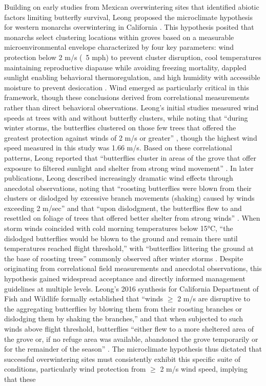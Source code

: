 Building on early studies from Mexican overwintering sites that identified abiotic factors limiting butterfly survival, Leong proposed the microclimate hypothesis for western monarchs overwintering in California \parencite{leongMicroenvironmentalFactorsAssociated1990}. This hypothesis posited that monarchs select clustering locations within groves based on a measurable microenvironmental envelope characterized by four key parameters: wind protection below 2 m/s (~5 mph) to prevent cluster disruption, cool temperatures maintaining reproductive diapause while avoiding freezing mortality, dappled sunlight enabling behavioral thermoregulation, and high humidity with accessible moisture to prevent desiccation \parencite{leongMicroenvironmentalFactorsAssociated1990,leongUseMultivariateAnalyses1991}. Wind emerged as particularly critical in this framework, though these conclusions derived from correlational measurements rather than direct behavioral observations. Leong's initial studies measured wind speeds at trees with and without butterfly clusters, while noting that ``during winter storms, the butterflies clustered on those few trees that offered the greatest protection against winds of 2 m/s or greater'' \parencite{leongMicroenvironmentalFactorsAssociated1990}, though the highest wind speed measured in this study was 1.66 m/s. Based on these correlational patterns, Leong reported that ``butterflies cluster in areas of the grove that offer exposure to filtered sunlight and shelter from strong wind movement'' \parencite{leongUseMultivariateAnalyses1991}. In later publications, Leong described increasingly dramatic wind effects through anecdotal observations, noting that ``roosting butterflies were blown from their clusters or dislodged by excessive branch movements (shaking) caused by winds exceeding 2 m/sec'' and that ``upon dislodgment, the butterflies flew to and resettled on foliage of trees that offered better shelter from strong winds'' \parencite{leongRestorationOverwinteringGrove1999}. When storm winds coincided with cold morning temperatures below 15°C, ``the dislodged butterflies would be blown to the ground and remain there until temperatures reached flight threshold,'' with ``butterflies littering the ground at the base of roosting trees'' commonly observed after winter storms \parencite{leongRestorationOverwinteringGrove1999}. Despite originating from correlational field measurements and anecdotal observations, this hypothesis gained widespread acceptance and directly informed management guidelines at multiple levels. Leong's 2016 synthesis for California Department of Fish and Wildlife formally established that ``winds $\geq$ 2 m/s are disruptive to the aggregating butterflies by blowing them from their roosting branches or dislodging them by shaking the branches,'' and that when subjected to such winds above flight threshold, butterflies ``either flew to a more sheltered area of the grove or, if no refuge area was available, abandoned the grove temporarily or for the remainder of the season'' \parencite{leongEvaluationManagementCalifornia2016}. The microclimate hypothesis thus dictated that successful overwintering sites must consistently exhibit this specific suite of conditions, particularly wind protection from $\geq$ 2 m/s wind speed, implying that these 